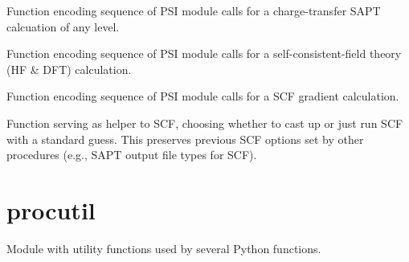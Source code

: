 \documentclass[letterpaper,10pt,english]{sphinxmanual}
\begin{document}

\begin{fulllineitems}
\label{index:proc.run_sapt_ct}
Function encoding sequence of PSI module calls for
a charge-transfer SAPT calcuation of any level.

\end{fulllineitems}


\begin{fulllineitems}
\label{index:proc.run_scf}
Function encoding sequence of PSI module calls for
a self-consistent-field theory (HF \& DFT) calculation.

\end{fulllineitems}


\begin{fulllineitems}
\label{index:proc.run_scf_gradient}
Function encoding sequence of PSI module calls for
a SCF gradient calculation.

\end{fulllineitems}


\begin{fulllineitems}
\label{index:proc.scf_helper}
Function serving as helper to SCF, choosing whether to cast
up or just run SCF with a standard guess. This preserves
previous SCF options set by other procedures (e.g., SAPT
output file types for SCF).

\end{fulllineitems}



\section{procutil}
\label{index:procutil}\label{index:module-procutil}
Module with utility functions used by several Python functions.
\end{document}
